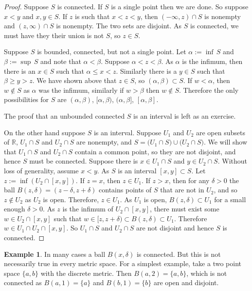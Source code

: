 \documentclass[12pt]{book}
\newcommand{\R}{{\mathbb{R}}}
\theoremstyle{plain}
\theoremstyle{remark}
\theoremstyle{definition}
\theoremstyle{exercise}
\theoremstyle{example}
\newtheorem{example}[thm]{Example}
\begin{document}
\begin{proof}
Suppose $S$ is connected.  If $S$ is a single point
then we are done.  So suppose $x < y$ and $x,y \in S$.  If $z$ is such
that $x < z < y$, then $(-\infty,z) \cap S$ is nonempty and $(z,\infty) \cap
S$ is nonempty.  The two sets are disjoint.  As
$S$ is connected, we must have they their union is not $S$, so $z \in S$.

Suppose $S$ is bounded, connected, but not a single point.
Let $\alpha := \inf \, S$ and
$\beta := \sup \, S$ and note that $\alpha < \beta$.  Suppose $\alpha < z < \beta$.  As $\alpha$ is the
infimum, then there is an $x \in S$ such that $\alpha \leq x < z$.  Similarly
there is a $y \in S$ such that $\beta \geq y > z$. 
We have shown above that $z \in S$, so $(\alpha,\beta) \subset S$.
If $w < \alpha$, then $w \notin S$
as $\alpha$ was the infimum,
similarly if $w > \beta$ then $w \notin S$.  Therefore the only
possibilities for $S$ are
$(\alpha,\beta)$,
$[\alpha,\beta)$,
$(\alpha,\beta]$,
$[\alpha,\beta]$.

The proof that an unbounded connected $S$ is an interval is left as an exercise.

On the other hand suppose $S$ is an interval.
Suppose $U_1$ and $U_2$ are open subsets of $\R$,
$U_1 \cap S$ and $U_2 \cap S$ are nonempty, and
$S = 
\bigl( U_1 \cap S \bigr)
\cup
\bigl( U_2 \cap S \bigr)$.  We will show that $U_1 \cap S$
and $U_2 \cap S$ contain a common point, so they are not disjoint,
and hence $S$ must be connected.
Suppose there is $x \in U_1 \cap S$
and $y \in U_2 \cap S$.  Without loss of generality, assume $x < y$.  As $S$ is an interval
$[x,y] \subset S$.  Let $z := \inf (U_2 \cap [x,y])$.
If $z = x$, then $z
\in U_1$.  If $z > x$,
then for any $\delta > 0$ the 
ball $B(z,\delta) =
(z-\delta,z+\delta)$ contains points of $S$ that are not
in $U_2$, and so $z \notin U_2$ as $U_2$ is open.
Therefore, $z \in U_1$.
As $U_1$ is open, $B(z,\delta) \subset U_1$ for a small enough $\delta >
0$.
As $z$ is the infimum of $U_2 \cap [x,y]$, 
there must exist some $w \in U_2 \cap [x,y]$
such that $w \in [z,z+\delta) \subset B(z,\delta) \subset U_1$.
Therefore $w \in U_1 \cap U_2 \cap [x,y]$.
So $U_1 \cap S$ and $U_2 \cap S$ are not disjoint and hence $S$ is connected.
\end{proof}

\begin{example}
In many cases a ball $B(x,\delta)$ is connected.  But this is not
necessarily true in every metric space.
For a simplest example, take a two point space $\{ a,
b\}$ with the discrete metric.  Then $B(a,2) = \{ a , b \}$, which is not
connected as $B(a,1) = \{ a \}$ and 
$B(b,1) = \{ b \}$ are open and disjoint.
\end{example}
\end{document}

